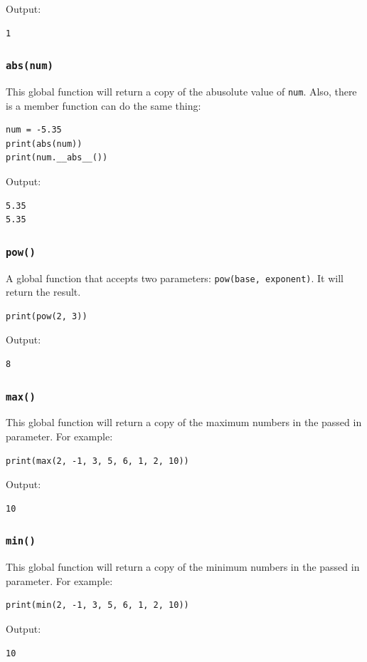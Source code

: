 \documentclass[12pt]{book}
\begin{document}
Output:
\begin{verbatim}
1
\end{verbatim}
\subsubsection{\texttt{abs(num)}}
\label{sec:orga09a1f5}
This global function will return a copy of the abusolute value of \texttt{num}. Also, there is a member function can do the same thing:
\begin{verbatim}
num = -5.35
print(abs(num))
print(num.__abs__())
\end{verbatim}
Output:
\begin{verbatim}
5.35
5.35
\end{verbatim}

\subsubsection{\texttt{pow()}}
\label{sec:orgc347c65}
A global function that accepts two parameters: \texttt{pow(base, exponent)}. It will return the result.
\begin{verbatim}
print(pow(2, 3))
\end{verbatim}
Output:
\begin{verbatim}
8
\end{verbatim}

\subsubsection{\texttt{max()}}
\label{sec:org67bfd2c}
This global function will return a copy of the maximum numbers in the passed in parameter. For example:
\begin{verbatim}
print(max(2, -1, 3, 5, 6, 1, 2, 10))
\end{verbatim}
Output:
\begin{verbatim}
10
\end{verbatim}

\subsubsection{\texttt{min()}}
\label{sec:orgc228387}
This global function will return a copy of the minimum numbers in the passed in parameter. For example:
\begin{verbatim}
print(min(2, -1, 3, 5, 6, 1, 2, 10))
\end{verbatim}
Output:
\begin{verbatim}
10
\end{verbatim}
\end{document}
